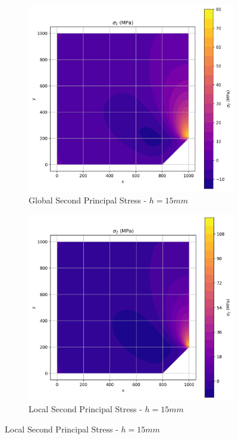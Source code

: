 \begin{figure}[H]
  \centering
  \begin{subfigure}[b]{0.45\textwidth}
    \centering
    \includegraphics[width=\textwidth]{GRAFICOS/Quad4/1.75mm_global/resultados - sigma_2.png}
    \caption{Global Second Principal Stress - $h=15mm$}
    \label{fig:img11}
  \end{subfigure}
  \hfill
  \begin{subfigure}[b]{0.45\textwidth}
    \centering
    \includegraphics[width=\textwidth]{GRAFICOS/Quad4/1.75mm_local/resultados - sigma_2.png}
    \caption{Local Second Principal Stress - $h=15mm$}
    \label{fig:img21}
  \end{subfigure}
\end{figure}


